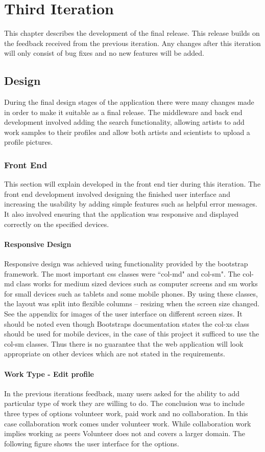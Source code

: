 \documentclass[a4paper,oneside,11pt]{report}
\begin{document}
\chapter{Third Iteration}
This chapter describes the development of the final release. This release builds on the feedback received from the previous iteration. Any changes after this iteration will only consist of bug fixes and no new features will be added.
\section{Design}
During the final design stages of the application there were many changes made in order to make it suitable as a final release.  The middleware and back end development involved adding the search functionality, allowing artists to add work samples to their profiles and allow both artists and scientists to upload a profile pictures.
\subsection{Front End}
This section will explain developed in the front end tier during this iteration. The front end development involved designing the finished user interface and increasing the usability by adding simple features such as helpful error messages. It also involved ensuring that the application was responsive and displayed correctly on the specified devices.
\subsubsection{Responsive Design}
Responsive design was achieved using functionality provided by the bootstrap framework. The most important css classes were ``col-md" and col-sm". The col-md class works for medium sized devices such as computer screens and sm works for small devices such as tablets and some mobile phones. By using these classes, the layout was split into flexible columns – resizing when the screen size changed. See the appendix for images of the user interface on different screen sizes. It should be noted even though Bootstraps documentation states the col-xs class should be used for mobile devices, in the case of this project it sufficed to use the col-sm classes. Thus there is no guarantee that the web application will look appropriate on other devices which are not stated in the requirements.

\subsubsection{Work Type - Edit profile}
In the previous iterations feedback, many users asked for the ability to add particular type of work they are willing to do. The conclusion was to include three types of options volunteer work, paid work and no collaboration. In this case collaboration work comes under volunteer work. While collaboration work implies working as peers Volunteer does not and covers a larger domain. The following figure shows the user interface for the options.
\end{document}

